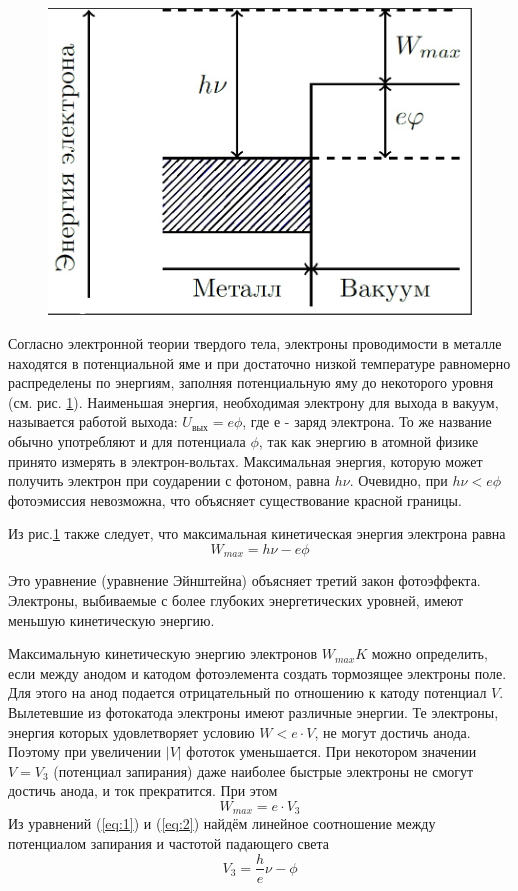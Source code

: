 \begin{figure}[h]
	\centering
	\includegraphics[]{fig/fig11}
	\caption{}
	\label{fig:1}
\end{figure}
Согласно электронной теории твердого тела, электроны проводимости в металле находятся в потенциальной яме и при достаточно низкой температуре равномерно распределены по энергиям, заполняя потенциальную яму до некоторого уровня (см. рис. \ref{fig:1}).
Наименьшая энергия, необходимая электрону для выхода в вакуум, называется работой выхода: $U_{\text{вых}} = e\phi$, где $е$ - заряд электрона. То же название обычно употребляют и для потенциала $\phi$, так как энергию в атомной физике принято измерять в электрон-вольтах. Максимальная энергия, которую может получить электрон при соударении с фотоном, равна $h \nu$. Очевидно, при $h \nu<e\phi$ фотоэмиссия невозможна, что объясняет существование красной границы.

Из рис.\ref{fig:1} также следует, что максимальная кинетическая энергия электрона равна
\begin{equation}
	\label{eq:1}
 	W_{max}=h \nu -e\phi
 \end{equation} 

Это уравнение (уравнение Эйнштейна) объясняет третий закон
фотоэффекта. Электроны, выбиваемые с более глубоких энергетических уровней, имеют меньшую кинетическую энергию.

Максимальную кинетическую энергию электронов $W_{max}K$ можно определить, если между анодом и катодом фотоэлемента создать тормозящее электроны поле. Для этого на анод подается отрицательный по отношению к катоду потенциал $V$. Вылетевшие из фотокатода электроны имеют различные энергии. Те электроны, энергия которых удовлетворяет условию $W < e\cdot V$, не могут достичь анода. Поэтому при увеличении $ |V|$ фототок уменьшается. При некотором значении $V = V_{3}$ (потенциал запирания) даже наиболее быстрые электроны не смогут достичь анода, и ток прекратится. При этом
\begin{equation}
	\label{eq:2}
	W_{max}=e\cdot V_{3}
\end{equation}
Из уравнений (\ref{eq:1}) и (\ref{eq:2}) найдём линейное соотношение между потенциалом запирания и частотой падающего света
\begin{equation}
	\label{eq:3}
	V_{3}=\frac he \nu-\phi
\end{equation}

